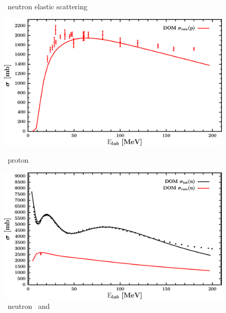 \begin{figure}[hbtp]
\begin{minipage}{0.47\textwidth}
        \caption*{\pbEight\ neutron elastic scattering}
        \label{DOMFitData_pb208_neutron_elastic}
    \end{minipage}
\end{figure}
\vspace{0.70in}
\begin{figure}[hbtp]
    \centering
    \begin{minipage}{0.47\textwidth}
        \centering
        \includegraphics[width=\linewidth]{figures/pb208_protonInelastic.png}
        \caption*{\pbEight\ proton \rxn}
        \label{DOMFitData_pb208_proton_inelastic}
    \end{minipage}\hspace{6pt}
    \begin{minipage}{0.47\textwidth}
        \centering
        \includegraphics[width=\textwidth]{figures/pb208_neutronInelastic.png}
        \caption*{\pbEight\ neutron \rxn\ and \tot}
        \label{DOMFitData_pb208_neutron_inelastic}
    \end{minipage}
\end{figure}
